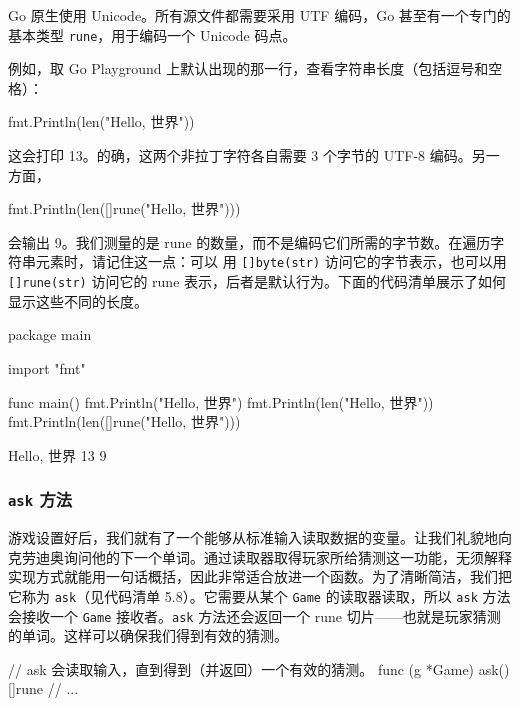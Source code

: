 Go 原生使用 Unicode。所有源文件都需要采用 UTF 编码，Go 甚至有一个专门的基本类型 \texttt{rune}，用于编码一个 Unicode 码点。

例如，取 Go Playground 上默认出现的那一行，查看字符串长度（包括逗号和空格）：

\begin{gocode}[]
fmt.Println(len("Hello, 世界"))
\end{gocode}

这会打印 13。的确，这两个非拉丁字符各自需要 3 个字节的 UTF-8 编码。另一方面，

\begin{gocode}[]
fmt.Println(len([]rune("Hello, 世界")))
\end{gocode}

会输出 9。我们测量的是 rune 的数量，而不是编码它们所需的字节数。在遍历字符串元素时，请记住这一点：可以
用 \texttt{[]byte(str)} 访问它的字节表示，也可以用 \texttt{[]rune(str)} 访问它的 rune 表示，后者是默认行为。下面的代码清单展示了如何显示这些不同的长度。

\begin{gocode}[title={代码清单 5.7 打印字符串和 rune 的长度}]
package main

import "fmt"

func main() {
    fmt.Println("Hello, 世界")
    fmt.Println(len("Hello, 世界"))
    fmt.Println(len([]rune("Hello, 世界")))
}
\end{gocode}

\begin{shellcode}[title={控制台输出}]
Hello, 世界
13
9
\end{shellcode}

\subsubsection*{\texttt{ask} 方法}

游戏设置好后，我们就有了一个能够从标准输入读取数据的变量。让我们礼貌地向克劳迪奥询问他的下一个单词。通过读取器取得玩家所给猜测这一功能，无须解释实现方式就能用一句话概括，因此非常适合放进一个函数。为了清晰简洁，我们把它称为 \texttt{ask}（见代码清单 5.8）。它需要从某个 \texttt{Game} 的读取器读取，所以 \texttt{ask} 方法会接收一个 \texttt{Game} 接收者。\texttt{ask} 方法还会返回一个 rune 切片——也就是玩家猜测的单词。这样可以确保我们得到有效的猜测。

\begin{gocode}[title={代码清单 5.8 \texttt{game.go}：\texttt{ask} 方法签名}]
// ask 会读取输入，直到得到（并返回）一个有效的猜测。
func (g *Game) ask() []rune {
    // ...
}
\end{gocode}

